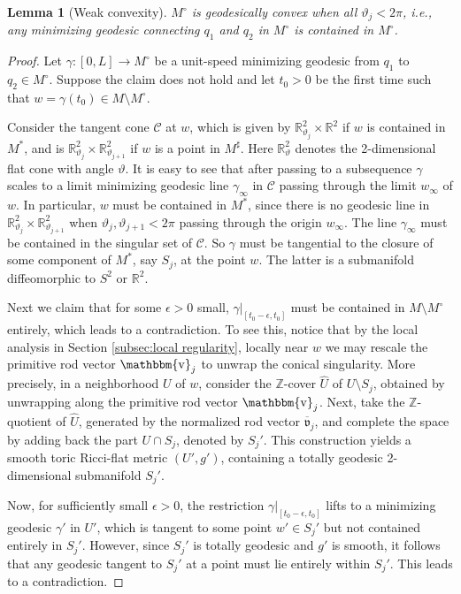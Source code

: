 \documentclass[a4paper,11pt]{amsart}
\newtheorem{lemma}[theorem]{Lemma}
\theoremstyle{definition}
\numberwithin{equation}{section}
\newcommand{\R}{\mathbb{R}}
\newcommand{\mv} {\mathfrak v}
\DeclareMathOperator{\bbv}{\mathbbm{v}}
\begin{document}
\begin{lemma}[Weak convexity]
    $M^\circ$ is geodesically convex when all $\vartheta_j<2\pi$, i.e., any minimizing geodesic connecting $q_1$ and $q_2$ in $M^\circ$ is contained in $M^\circ$.
\end{lemma}
\begin{proof}
    Let $\gamma:[0, L]\rightarrow M^\circ$ be a unit-speed minimizing geodesic from $q_1$ to $q_2\in M^\circ$. Suppose the claim does not hold and  let $t_0>0$ be the first time such that $w=\gamma(t_0)\in M\setminus M^\circ$. 
    
    Consider the tangent cone $\mathcal C$ at $w$, which is given by $\mathbb R^2_{\vartheta_j}\times \mathbb R^2$ if $w$ is contained in $M^*$, and is $\mathbb{R}^2_{\vartheta_j}\times\mathbb R^2_{\vartheta_{j+1}}$ if $w$ is a point in $M^\sharp$. Here $\mathbb R^2_\vartheta$ denotes the 2-dimensional flat cone with angle $\vartheta$.  It is easy to see that after passing to a subsequence $\gamma$ scales to a limit  minimizing geodesic line $\gamma_\infty$ in $\mathcal C$ passing through the limit $w_\infty$ of $w$. In particular, $w$ must be contained in $M^*$, since there is no geodesic line in $\mathbb{R}^2_{\vartheta_j}\times\mathbb R^2_{\vartheta_{j+1}}$ when $\vartheta_j,\vartheta_{j+1}<2\pi$ passing through the origin $w_\infty$. The line $\gamma_\infty$ must be contained in the singular set of $\mathcal C$. So $\gamma$ must be tangential to the closure of some component of $M^*$, say $S_j$, at the point $w$. The latter is a submanifold diffeomorphic to $S^2$ or $\R^2$.

    Next we claim that for some $\epsilon>0$ small, $\gamma|_{[t_0-\epsilon, t_0]}$ must be contained in $M\setminus M^\circ$ entirely, which leads to a contradiction. To see this, notice that by the local analysis in Section \ref{subsec:local regularity},
    locally near $w$ we may rescale the primitive rod vector $\bbv_j$ to unwrap the conical singularity. More precisely, in a neighborhood \( U \) of \( w \), consider the \( \mathbb{Z} \)-cover \( \widehat{U} \) of \( U \setminus S_j \), obtained by unwrapping along the primitive rod vector \( \bbv_j \). Next, take the \( \mathbb{Z} \)-quotient of \( \widehat{U} \), generated by the normalized rod vector \( \overline{\mv}_j \), and complete the space by adding back the part \( U \cap S_j \), denoted by \( S_j' \). This construction yields a smooth toric Ricci-flat metric \( (U', g') \), containing a totally geodesic 2-dimensional submanifold \( S_j' \).

Now, for sufficiently small \( \epsilon > 0 \), the restriction \( \gamma|_{[t_0 - \epsilon, t_0]} \) lifts to a minimizing geodesic \( \gamma' \) in \( U' \), which is tangent to some point \( w' \in S_j' \) but not contained entirely in \( S_j' \). However, since \( S_j' \) is totally geodesic and \( g' \) is smooth, it follows that any geodesic tangent to \( S_j' \) at a point must lie entirely within \( S_j' \). This leads to a contradiction.
\end{proof}
\end{document}
